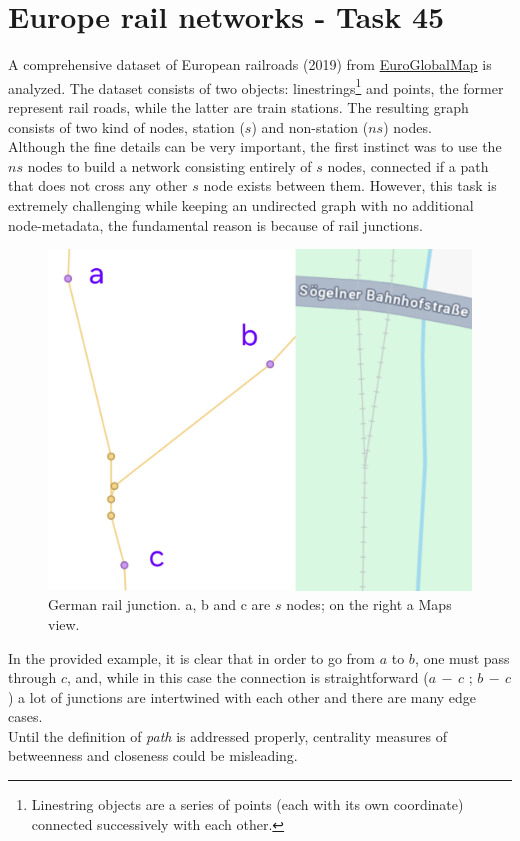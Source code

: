 \chapter{Europe rail networks - Task 45}

A comprehensive dataset of European railroads (2019) from \href{https://www.mapsforeurope.org/datasets/euro-global-map}{EuroGlobalMap} is analyzed. 
The dataset consists of two objects: linestrings\footnote{Linestring objects are a series of points (each with its own coordinate) connected successively with each other.} and points, the former represent rail roads, while the latter are train stations. 
The resulting graph consists of two kind of nodes, station ($s$) and non-station ($ns$) nodes.\\
Although the fine details can be very important, the first instinct was to use the $ns$ nodes to build a network consisting entirely of $s$ nodes, connected if a path that does not cross any other $s$ node exists between them. However, this task is extremely challenging while keeping an undirected graph with no additional node-metadata, the fundamental reason is because of rail junctions.

\begin{figure}  
\label{fig:junctionexample}
  \centering
  \vspace{-\baselineskip}    %
  \includegraphics[width=\linewidth,keepaspectratio]{images/junction_example.jpg}
  \caption{German rail junction. a, b and c are $s$ nodes; on the right a Maps view.}

\end{figure}
In the provided example, it is clear that in order to go from $a$ to $b$, one must pass through $c$, and, while in this case the connection is straightforward ($a \, - \, c$  ;  $b\, - \, c$) a lot of junctions are intertwined with each other and there are many edge cases.\\
Until the definition of \emph{path} is addressed properly, centrality measures of betweenness and closeness could be misleading.


